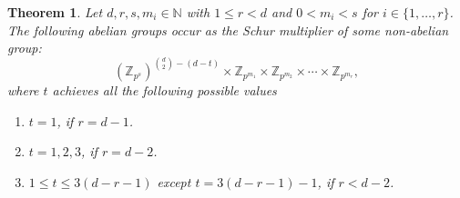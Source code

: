 \documentclass[10pt,a4paper]{amsart}
\newtheorem{theorem}{Theorem}
\newcommand{\Z}{\mathbb{Z}}
\begin{document}
\begin{theorem} \label{bound M(G_{j,k})}
 Let $d, r, s , m_i \in \mathbb{N}$ with $1 \leq r < d$ and
$0 < m_i < s$ for $i \in \{1, \ldots,r\}$.
The following abelian groups occur as the Schur multiplier of some non-abelian group:
 $$ (\Z_{p^s})^{\binom{d}{2}-(d-t)} \times  \Z_{p^{m_1}} \times \Z_{p^{m_2}} \times \cdots \times \Z_{p^{m_r}},$$
 where $t$ achieves all the following possible values
\begin{enumerate}
\item [(i)] $t=1$, if $r=d-1$.
    \item [(ii)]  $ t=1,2,3$, if $r=d-2$.
 \item [(iii)]  $1  \le t \le 3(d-r-1)$ except ${t=3(d-r-1)-1}$, if $r< d-2$.
\end{enumerate}
\end{theorem}
\end{document}
